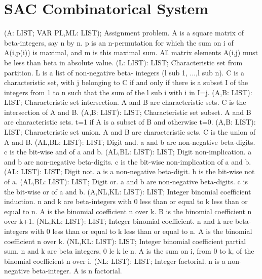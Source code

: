 \section{ SAC Combinatorical System  } 
 (A: LIST; VAR PL,ML: LIST); \eproc
\bcom Assignment problem. A is a square matrix of beta-integers, say
n by n.  p is an n-permutation for which the sum on i of
A(i,p(i)) is maximal, and m is this maximal sum.  All matrix
elements A(i,j) must be less than beta in absolute value. \ecom 
{} (L: LIST): LIST; \eproc
\bcom Characteristic set from partition. L is a list of non-negative beta-
integers (l sub 1, ...,l sub n).  C is a characteristic set, with j
belonging to C if and only if there is a subset I of the integers from
1 to n such that the sum of the l sub i with i in I=j. \ecom 
{} (A,B: LIST): LIST; \eproc
\bcom Characteristic set intersection. A and B are characteristic sets.
C is the intersection of A and B. \ecom 
{} (A,B: LIST): LIST; \eproc
\bcom Characteristic set subset. A and B are characteristic sets. t=1 if
A is a subset of B and otherwise t=0. \ecom 
{} (A,B: LIST): LIST; \eproc
\bcom Characteristic set union. A and B are characteristic sets. C is the
union of A and B. \ecom 
{} (AL,BL: LIST): LIST; \eproc
\bcom Digit and. a and b are non-negative beta-digits. c is the
bit-wise and of a and b. \ecom 
{} (AL,BL: LIST): LIST; \eproc
\bcom Digit non-implication. a and b are non-negative beta-digits. c
is the bit-wise non-implication of a and b. \ecom 
{} (AL: LIST): LIST; \eproc
\bcom Digit not. a is a non-negative beta-digit. b is the bit-wise
not of a. \ecom 
{} (AL,BL: LIST): LIST; \eproc
\bcom Digit or. a and b are non-negative beta-digits. c is the
bit-wise or of a and b. \ecom 
{} (A,NL,KL: LIST): LIST; \eproc
\bcom Integer binomial coefficient induction. n and k are beta-integers
with 0 less than or equal to k less than or equal to n.  A is the
binomial coefficient n over k.  B is the binomial coefficient n
over k+1. \ecom 
{} (NL,KL: LIST): LIST; \eproc
\bcom Integer binomial coefficient. n and k are beta-integers with
0 less than or equal to k less than or equal to n.  A is the binomial
coefficient n over k. \ecom 
{} (NL,KL: LIST): LIST; \eproc
\bcom Integer binomial coefficient partial sum. n and k are
beta integers, 0 le k le n.  A is the sum on i, from 0 to k, of the
binomial coefficient n over i. \ecom 
{} (NL: LIST): LIST; \eproc
\bcom Integer factorial. n is a non-negative beta-integer. A is
n factorial. \ecom 
